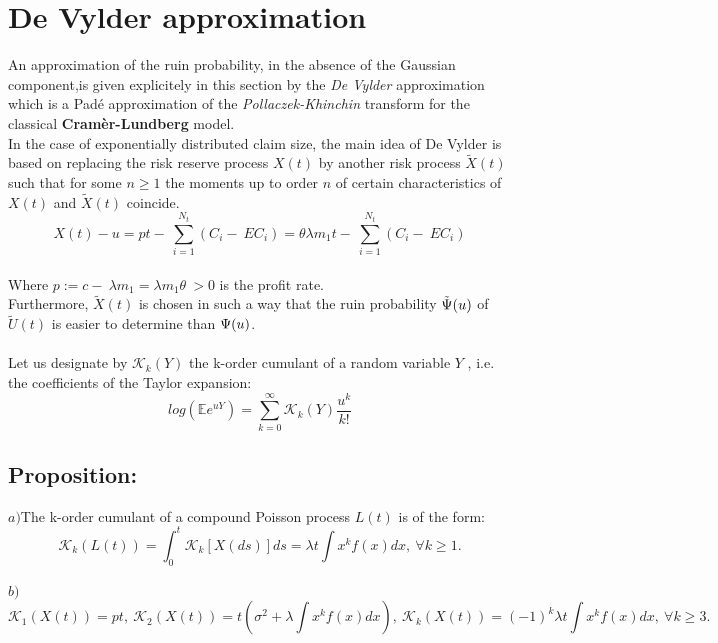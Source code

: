 \section{De Vylder approximation}
 An approximation of the ruin probability, in the absence of the Gaussian component,is given explicitely in this section by the \textit{De Vylder} approximation which is a Padé approximation of the \textit{Pollaczek-Khinchin} transform for the classical \textbf{Cramèr-Lundberg} model.\\
 In the case of exponentially distributed claim size, the main idea of De Vylder is based on replacing the risk reserve process {$X(t)$} by another risk process { $\tilde{X}(t)$} such that for some $n\geq 1$ the moments up to order $n$ of certain characteristics of {$ X(t)$} and {$\tilde{X}(t)$} coincide. \\
 \begin{equation*}
 X(t)-u = pt -\ \sum_{i=1}^{N_{t}} (C_{i} -\ EC_{i}) = \theta \lambda m_{1}t - \ \sum_{i=1}^{N_{t}} (C_{i} -\ EC_{i})
 \end{equation*} \\
 Where $ p:= c- \ \lambda m_{1} =\lambda m_{1} \theta \ > 0$ is the profit rate. \\

 Furthermore, {$\tilde{X}(t)$} is chosen in such a way that the ruin probability $\tilde{\Psi}(u)$ of {$\tilde{U}(t)$} is easier to determine than $\Psi (u)$. \\ \\
Let us designate by $\mathcal{K}_{k}(Y)$ the k-order cumulant of a random variable $Y$ , i.e. the  coefficients of the Taylor expansion:
\begin{equation*}
log( \mathbb{E}e^{u Y}) =\sum_{k=0}^{\infty} \mathcal{K}_{k}(Y)\frac{u^{k}}{k!}
\end{equation*}
\subsection{Proposition:}
$a)$The k-order cumulant of a compound Poisson process $L(t)$ is of the form: \\
\begin{equation*}
\mathcal{K}_{k}(L(t)) =\int_{0}^{t} \mathcal{K}_{k}[X(ds)]ds = \lambda t  \int x^{k}f(x) dx, \ \forall k\geq 1.
\end{equation*} \\
$b)$
\begin{equation*}
\mathcal{K}_{1}(X(t))= pt , \ \mathcal{K}_{2}(X(t)) =t(\sigma^{2} +\lambda \int x^{k}f(x) dx) , \ \mathcal{K}_{k}(X(t))= (-1)^{k}\lambda t \int x^{k} f(x) dx , \ \forall k\geq 3.
\end{equation*}
